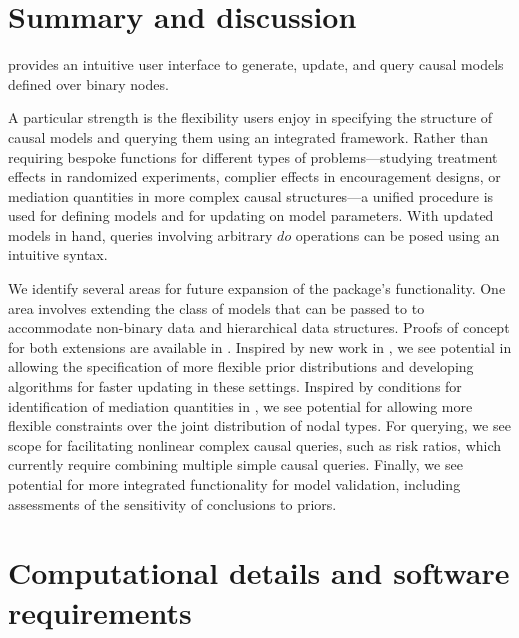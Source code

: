\documentclass[
  11pt,
  article]{jss}
\renewcommand{\texttt}[1]{\code{#1}}
\begin{document}
\section{Summary and discussion}\label{summary-and-discussion}

 provides an intuitive user interface to generate,
update, and query causal models defined over binary nodes.

A particular strength is the flexibility users enjoy in specifying the
structure of causal models and querying them using an integrated
framework. Rather than requiring bespoke functions for different types
of problems---studying treatment effects in randomized experiments,
complier effects in encouragement designs, or mediation quantities in
more complex causal structures---a unified procedure is used for
defining models and for updating on model parameters. With updated
models in hand, queries involving arbitrary \(do\) operations can be
posed using an intuitive syntax.

We identify several areas for future expansion of the package's
functionality. One area involves extending the class of models that can
be passed to \texttt{make\_model()} to accommodate non-binary data and
hierarchical data structures. Proofs of concept for both extensions are
available in \citet{humphreys_integrated_2023}. Inspired by new work in
\citet{irons2023causally}, we see potential in allowing the
specification of more flexible prior distributions and developing
algorithms for faster updating in these settings. Inspired by conditions
for identification of mediation quantities in
\citet{forastiere2018principal}, we see potential for allowing more
flexible constraints over the joint distribution of nodal types. For
querying, we see scope for facilitating nonlinear complex causal
queries, such as risk ratios, which currently require combining multiple
simple causal queries. Finally, we see potential for more integrated
functionality for model validation, including assessments of the
sensitivity of conclusions to priors.

\FloatBarrier

\newpage{}

\section*{Computational details and software
requirements}\label{computational-details-and-software-requirements}
\end{document}
